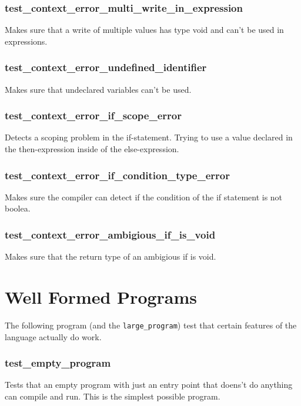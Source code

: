 \documentclass{report}
\begin{document}
\subsubsection*{test\_context\_error\_multi\_write\_in\_expression}

Makes sure that a write of multiple values has type void and can't
be used in expressions.

\subsubsection*{test\_context\_error\_undefined\_identifier}

Makes sure that undeclared variables can't be used.

\subsubsection*{test\_context\_error\_if\_scope\_error}

Detects a scoping problem in the if-statement. Trying to use a value
declared in the then-expression inside of the else-expression.

\subsubsection*{test\_context\_error\_if\_condition\_type\_error}

Makes sure the compiler can detect if the condition of the if
statement is not boolea.

\subsubsection*{test\_context\_error\_ambigious\_if\_is\_void}

Makes sure that the return type of an ambigious if is void.

\section{Well Formed Programs}

The following program (and the \texttt{large\_program}) test that
certain features of the language actually do work.

\subsubsection*{test\_empty\_program}

Tests that an empty program with just an entry point that doens't do
anything can compile and run. This is the simplest possible program.
\end{document}

